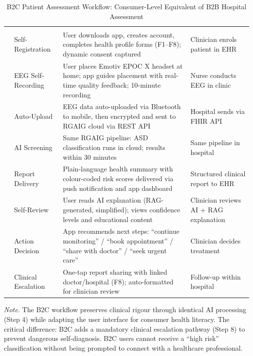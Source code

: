 {\tablestripes\tablefontsize

\begin{xltabular}{\textwidth}{@{} >{\raggedright\arraybackslash}p{0.6cm} >{\raggedright\arraybackslash}p{2.8cm} L >{\raggedright\arraybackslash}p{2.5cm} @{}}
\caption[B2C Patient Assessment Workflow: Consumer-Level]{B2C Patient Assessment Workflow: Consumer-Level Equivalent of B2B Hospital Assessment}\label{tab:b2c_assessment_workflow} \\
\toprule
\thead{\#} &  &  &  \\
\midrule
\endfirsthead
\toprule
\thead{\#} &  &  &  \\
\midrule
\endhead
\bottomrule
{} & Self-Registration & User downloads app, creates account, completes health profile forms (F1--F8); dynamic consent captured & Clinician enrols patient in EHR \\
 & EEG Self-Recording & User places Emotiv EPOC X headset at home; app guides placement with real-time quality feedback; 10-minute recording & Nurse conducts EEG in clinic \\
 & Auto-Upload & EEG data auto-uploaded via Bluetooth to mobile, then encrypted and sent to RGAIG cloud via REST API & Hospital sends via FHIR API \\
 & AI Screening & Same RGAIG pipeline: ASD classification runs in cloud; results within 30 minutes & Same pipeline in hospital \\
 & Report Delivery & Plain-language health summary with colour-coded risk scores delivered via push notification and app dashboard & Structured clinical report to EHR \\
 & Self-Review & User reads AI explanation (RAG-generated, simplified); views confidence levels and educational content & Clinician reviews AI + RAG explanation \\
 & Action Decision & App recommends next steps: ``continue monitoring'' / ``book appointment'' / ``share with doctor'' / ``seek urgent care'' & Clinician decides treatment \\
 & Clinical Escalation & One-tap report sharing with linked doctor/hospital (F8); auto-formatted for clinician review & Follow-up within hospital \\
\end{xltabular}}
\vspace{0.5em}
\noindent\textit{Note.} The B2C workflow preserves clinical rigour through identical AI processing (Step 4) while adapting the user interface for consumer health literacy. The critical difference: B2C adds a mandatory clinical escalation pathway (Step 8) to prevent dangerous self-diagnosis. B2C users cannot receive a ``high risk'' classification without being prompted to connect with a healthcare professional.
\fi %

